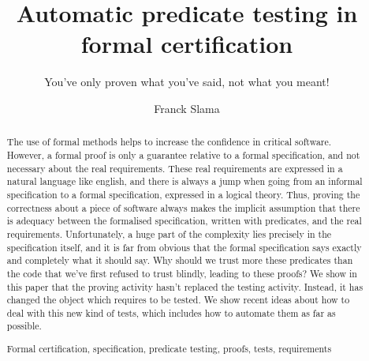 \documentclass[runningheads,a4paper]{llncs}
\newcommand{\keywords}[1]{\par\addvspace\baselineskip
\noindent\keywordname\enspace\ignorespaces#1}
\begin{document}
\mainmatter  %

\title{Automatic predicate testing in formal certification}
\subtitle{You've only proven what you've said, not what you meant!}



\author{Franck Slama\\
         }


\maketitle


\begin{abstract}
The use of formal methods helps to increase the confidence in critical software. However, a formal proof is only a guarantee relative to a formal specification, and not necessary about the real requirements. These real requirements are expressed in a natural language like english, and there is always a jump when going from an informal specification to a formal specification, expressed in a logical theory. Thus, proving the correctness about a piece of software always makes the implicit assumption that there is adequacy between the formalised specification, written with predicates, and the real requirements. Unfortunately, a huge part of the complexity lies precisely in the specification itself, and it is far from obvious that the formal specification says exactly and completely what it should say. Why should we trust more these predicates than the code that we've first refused to trust blindly, leading to these proofs? We show in this paper that the proving activity hasn't replaced the testing activity. Instead, it has changed the object which requires to be tested. We show recent ideas about how to deal with this new kind of tests, which includes how to automate them as far as possible.
\keywords{Formal certification, specification, predicate testing, proofs, tests, requirements}
\end{abstract}



\end{document}
